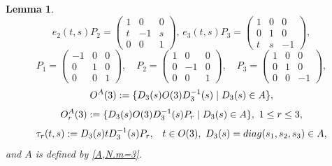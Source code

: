 \documentclass[preprint,12pt]{elsarticle}
\newtheorem{lem}[thm]{Lemma}
\numberwithin{equation}{section}
\begin{document}
\begin{lem}
\begin{equation}
 e_2(t,s)P_2\!=\! \left(\begin{smallmatrix}
1&0&0\\
t&-1&s\\
0&0&1
\end{smallmatrix}\right),\,
%
e_3(t,s)P_3\!=\! \left(\begin{smallmatrix}
1&0&0\\
  0&1&0\\
t&s&-1
\end{smallmatrix}\right),
\end{equation}
%
\begin{equation}
\label{m=3.P_k-orth} 
P_1=\left(\begin{smallmatrix}
-1&0&0\\
  0&1&0\\
0&0&1
\end{smallmatrix}\right),\quad
P_2=\left(\begin{smallmatrix}
1&0&0\\
0&-1&0\\
0&0&1
\end{smallmatrix}\right),\quad
P_3=\left(\begin{smallmatrix}
1&0&0\\
0&1&0\\
0&0&-1
\end{smallmatrix}\right),
\end{equation}
%
\begin{equation}
 \label{O^A(3)}
{\rm O}^A(3):=\{D_3(s){\rm O}(3)D^{-1}_3(s)\mid D_3(s)\in A\},
\end{equation}
\begin{equation}
 \label{O_r^A,-(3)}
{\rm O}_r^A(3):=\{D_3(s){\rm O}(3)D^{-1}_3(s)P_r\mid D_3(s)\in A\}
,\,\,1\leq r\leq 3,
\end{equation}
%
\begin{equation}
 \label{tau_r(t,s)}
\tau_r(t,s):=D_3(s)tD_3^{-1}(s)P_r,\,\,
\,\,\,t\in O(3),\,\,D_3(s)={\rm diag}(s_1,s_2,s_3)\in A,
\end{equation}
and $A$ is defined by \eqref{A,N.m=3}.
\end{lem}
\end{document}
